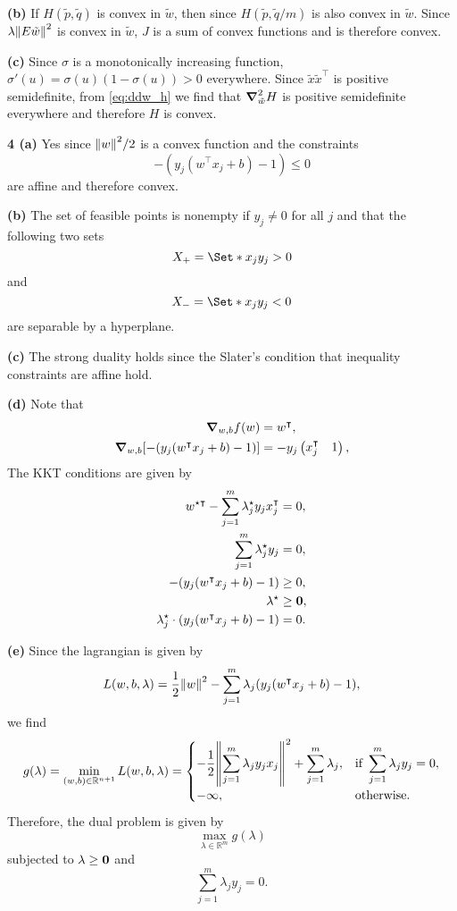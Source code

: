 \documentclass{article}
\makeatletter
\newcommand*{\shifttext}[1]{%
  \settowidth{\@tempdima}{#1}%
  \hspace{-\@tempdima}#1%
}
\newcommand{\plabel}[1]{%
\shifttext{\textbf{#1}\quad}%
}
\newcommand{\prule}{%
\begin{center}%
\hdashrule[0.5ex]{.99\linewidth}{1pt}{1pt 2.5pt}%
\end{center}%
}
\makeatother
\begin{document}
\plabel{(b)}%
If $H(\tilde{p},\tilde{q})$ is convex in $\tilde{w}$, then since $H(\tilde{p},\tilde{q}/m)$ is also convex in $\tilde{w}$.
Since $\lambda\norm{E\tilde{w}}^2$ is convex in $\tilde{w}$, $J$ is a sum of convex functions and is therefore convex.

\plabel{(c)}%
Since $\sigma$ is a monotonically increasing function, $\sigma'(u) = \sigma(u)(1-\sigma(u)) > 0$ everywhere.
Since $\tilde{x}\tilde{x}^\intercal$ is positive semidefinite, from \cref{eq:ddw_h} we find that $\grad^2_{\tilde{w}} H$ is positive semidefinite everywhere and therefore $H$ is convex.

\prule

\plabel{4 (a)}%
Yes since $\norm{w}^2/2$ is a convex function and the constraints
\[ -(y_j(w^\intercal x_j + b) - 1) \le 0 \]
are affine and therefore convex.

\plabel{(b)}%
The set of feasible points is nonempty if $y_j\neq 0$ for all $j$ and that the following two sets
\[ X_+ = \Set*{x_j}{y_j>0} \]
and
\[ X_- = \Set*{x_j}{y_j<0} \]
are separable by a hyperplane.

\plabel{(c)}%
The strong duality holds since the Slater's condition that inequality constraints are affine hold.

\plabel{(d)}%
Note that
\begin{align*}
    \grad_{w,b} f(w) &= w^\intercal, \\
    \grad_{w,b} \qty[-(y_j(w^\intercal x_j+b)-1)] &= - y_j \begin{pmatrix}
        x_j^\intercal & 1
    \end{pmatrix},
\end{align*}
The KKT conditions are given by
\begin{align*}
    w^{\star \intercal} - \sum_{j=1}^m \lambda^\star_j y_j x^\intercal_j &= 0, \\
    \sum_{j=1}^m \lambda_j^\star y_j &= 0, \\
    -(y_j(w^\intercal x_j + b) - 1) &\ge 0, \\
    \lambda^\star &\ge \vb{0}, \\
    \lambda^\star_j \cdot (y_j(w^\intercal x_j + b) - 1) &= 0.
\end{align*}

\plabel{(e)}%
Since the lagrangian is given by
\[ L(w,b,\lambda) = \frac{1}{2}\norm{w}^2 - \sum_{j=1}^m \lambda_j (y_j(w^\intercal x_j+b)-1), \]
we find
\[ g(\lambda) = \min_{(w,b)\in\mathbb{R}^{n+1}} L(w,b,\lambda) = \begin{cases}
    \displaystyle -\frac{1}{2}\norm{\sum_{j=1}^m \lambda_j y_j x_j}^2 + \sum_{j=1}^m \lambda_j, &\displaystyle \text{if } \sum_{j=1}^m \lambda_j y_j = 0, \\
    -\infty, &\text{otherwise}.
\end{cases} \]
Therefore, the dual problem is given by
\[ \max_{\lambda \in \mathbb{R}^m} g(\lambda) \]
subjected to $\lambda \ge \vb{0}$ and
\[ \sum_{j=1}^m \lambda_j y_j = 0. \]

% 
% 
\end{document}
